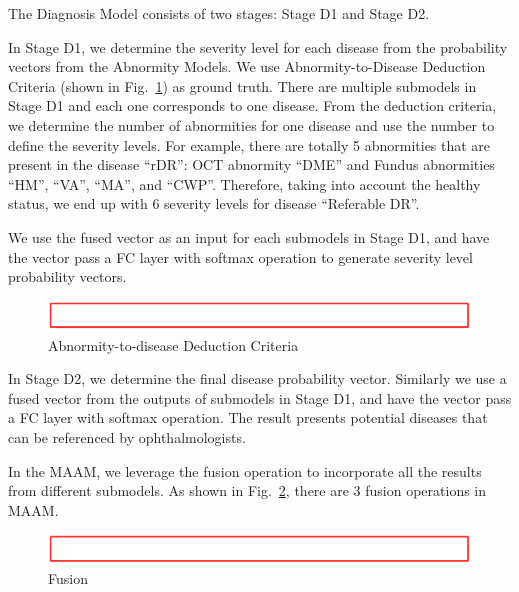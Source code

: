 \documentclass{article}
\begin{document}
	\vspace{0.5cm}
	
	The Diagnosis Model consists of two stages: Stage D1 and Stage D2. 
	
	\vspace{0.2cm}
	
	In Stage D1, we determine the severity level for each disease from the probability vectors from the Abnormity Models. We use Abnormity-to-Disease Deduction Criteria (shown in Fig.~\ref{fig:criteria}) as ground truth. There are multiple submodels in Stage D1 and each one corresponds to one disease. From the deduction criteria, we determine the number of abnormities for one disease and use the number to define the severity levels. For example, there are totally 5 abnormities that are present in the disease ``rDR'': OCT abnormity ``DME'' and Fundus abnormities ``HM'', ``VA'', ``MA'', and ``CWP''. Therefore, taking into account the healthy status, we end up with 6 severity levels for disease ``Referable DR''.

	We use the fused vector as an input for each submodels in Stage D1, and have the vector pass a FC layer with softmax operation to generate severity level probability vectors.
	
	\begin{figure}[htbp]
		\centering
		\includegraphics[width=\linewidth]{Figs/Temp.png}
		\caption{Abnormity-to-disease Deduction Criteria}
		\vspace{0.3cm}
		\label{fig:criteria}
	\end{figure}

	\vspace{0.2cm}
	
	In Stage D2, we determine the final disease probability vector. Similarly we use a fused vector from the outputs of submodels in Stage D1, and have the vector pass a FC layer with softmax operation. The result presents potential diseases that can be referenced by ophthalmologists.

	\vspace{0.5cm}
	
	In the MAAM, we leverage the fusion operation to incorporate all the results from different submodels. As shown in Fig.~\ref{fig:fusion}, there are 3 fusion operations in MAAM.
	
	\begin{figure}[htbp]
		\centering
		\includegraphics[width=\linewidth]{Figs/Temp.png}
		\caption{Fusion}
		\vspace{0.3cm}
		\label{fig:fusion}
	\end{figure}
\end{document}
